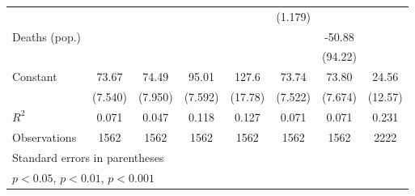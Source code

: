 \documentclass{article}
\begin{document}
{\begin{longtable}{l*{7}{c}}
                &                  &                  &                  &                  &  (1.179)         &                  &                  \\
Deaths (pop.)   &                  &                  &                  &                  &                  &   -50.88         &                  \\
                &                  &                  &                  &                  &                  &  (94.22)         &                  \\
Constant        &    73.67\sym{***}&    74.49\sym{***}&    95.01\sym{***}&    127.6\sym{***}&    73.74\sym{***}&    73.80\sym{***}&    24.56         \\
                &  (7.540)         &  (7.950)         &  (7.592)         &  (17.78)         &  (7.522)         &  (7.674)         &  (12.57)         \\
\hline
\(R^{2}\)       &    0.071         &    0.047         &    0.118         &    0.127         &    0.071         &    0.071         &    0.231         \\
Observations    &     1562         &     1562         &     1562         &     1562         &     1562         &     1562         &     2222         \\
\hline\hline
\multicolumn{8}{l}{\footnotesize Standard errors in parentheses}\\
\multicolumn{8}{l}{\footnotesize \sym{*} \(p<0.05\), \sym{**} \(p<0.01\), \sym{***} \(p<0.001\)}\\
\end{longtable}
}
\end{document}
